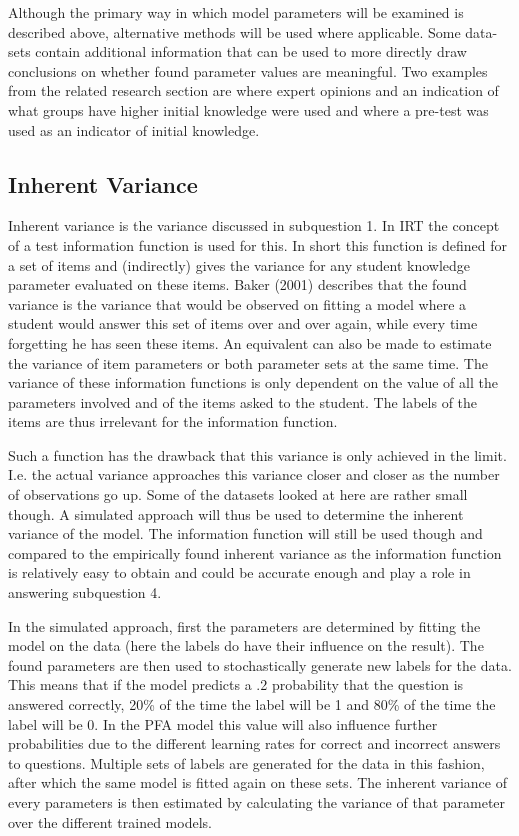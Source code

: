 \documentclass{scrartcl}
\begin{document}
Although the primary way in which model parameters will be examined is described above, alternative methods will be used where applicable. Some data-sets contain additional information that can be used to more directly draw conclusions on whether found parameter values are meaningful. Two examples from the related research section are \cite{eirt} where expert opinions and an indication of what groups have higher initial knowledge were used and \cite{ktpfa} where a pre-test was used as an indicator of initial knowledge.

\subsection{Inherent Variance}
Inherent variance is the variance discussed in subquestion 1. In IRT the concept of a test information function is used for this. In short this function is defined for a set of items and (indirectly) gives the variance for any student knowledge parameter evaluated on these items. Baker (2001) describes that the found variance is the variance that would be observed on fitting a model where a student would answer this set of items over and over again, while every time forgetting he has seen these items. An equivalent can also be made to estimate the variance of item parameters or both parameter sets at the same time. The variance of these information functions is only dependent on the value of all the parameters involved and of the items asked to the student. The labels of the items are thus irrelevant for the information function.

Such a function has the drawback that this variance is only achieved in the limit. I.e. the actual variance approaches this variance closer and closer as the number of observations go up. Some of the datasets looked at here are rather small though. A simulated approach will thus be used to determine the inherent variance of the model. The information function will still be used though and compared to the empirically found inherent variance as the information function is relatively easy to obtain and could be accurate enough and play a role in answering subquestion 4. 

In the simulated approach, first the parameters are determined by fitting the model on the data (here the labels do have their influence on the result). The found parameters are then used to stochastically generate new labels for the data. This means that if the model predicts a .2 probability that the question is answered correctly, 20\% of the time the label will be 1 and 80\% of the time the label will be 0. In the PFA model this value will also influence further probabilities due to the different learning rates for correct and incorrect answers to questions. Multiple sets of labels are generated for the data in this fashion, after which the same model is fitted again on these sets. The inherent variance of every parameters is then estimated by calculating the variance of that parameter over the different trained models.
\end{document}
